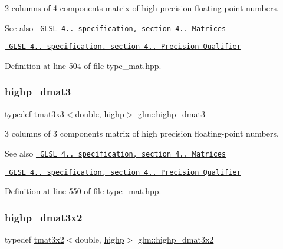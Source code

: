 2 columns of 4 components matrix of high precision floating-\/point numbers.

\begin{DoxySeeAlso}{See also}
\href{http://www.opengl.org/registry/doc/GLSLangSpec.4.20.8.pdf}{\texttt{ G\+L\+SL 4.. specification, section 4.. Matrices}} 

\href{http://www.opengl.org/registry/doc/GLSLangSpec.4.20.8.pdf}{\texttt{ G\+L\+SL 4.. specification, section 4.. Precision Qualifier}} 
\end{DoxySeeAlso}


Definition at line 504 of file type\+\_\+mat.\+hpp.

\mbox{\label{group__core__precision_gafa89ae412491446e508782ddd9bc55c7}} 
\subsubsection{\texorpdfstring{highp\_dmat3}{highp\_dmat3}}
{\footnotesize\ttfamily typedef \mbox{\hyperlink{structglm_1_1tmat3x3}{tmat3x3}}$<$double, \mbox{\hyperlink{namespaceglm_a0f04f086094c747d227af4425893f545ac6f7eab42eacbb10d59a58e95e362074}{highp}}$>$ \mbox{\hyperlink{group__core__precision_gafa89ae412491446e508782ddd9bc55c7}{glm\+::highp\+\_\+dmat3}}}

3 columns of 3 components matrix of high precision floating-\/point numbers.

\begin{DoxySeeAlso}{See also}
\href{http://www.opengl.org/registry/doc/GLSLangSpec.4.20.8.pdf}{\texttt{ G\+L\+SL 4.. specification, section 4.. Matrices}} 

\href{http://www.opengl.org/registry/doc/GLSLangSpec.4.20.8.pdf}{\texttt{ G\+L\+SL 4.. specification, section 4.. Precision Qualifier}} 
\end{DoxySeeAlso}


Definition at line 550 of file type\+\_\+mat.\+hpp.

\mbox{\label{group__core__precision_gafe7ef85b0bc26e754cbf83fed54bf106}} 
\subsubsection{\texorpdfstring{highp\_dmat3x2}{highp\_dmat3x2}}
{\footnotesize\ttfamily typedef \mbox{\hyperlink{structglm_1_1tmat3x2}{tmat3x2}}$<$double, \mbox{\hyperlink{namespaceglm_a0f04f086094c747d227af4425893f545ac6f7eab42eacbb10d59a58e95e362074}{highp}}$>$ \mbox{\hyperlink{group__core__precision_gafe7ef85b0bc26e754cbf83fed54bf106}{glm\+::highp\+\_\+dmat3x2}}}

